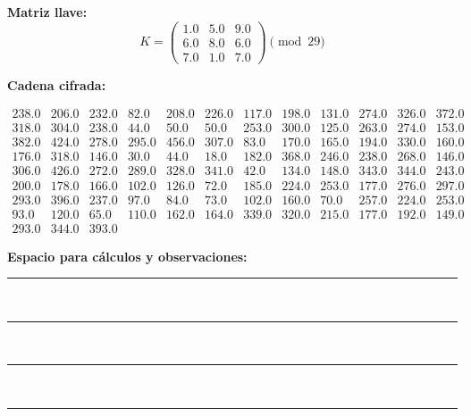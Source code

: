 \documentclass{article}%
\begin{document}
\textbf{Matriz llave:}
\[
K = \begin{pmatrix}
1.0 & 5.0 & 9.0 \\
6.0 & 8.0 & 6.0 \\
7.0 & 1.0 & 7.0
\end{pmatrix} \pmod{29}
\]

\textbf{Cadena cifrada:}
\begin{center}
$\begin{array}{lllllllllllllll}
238.0 & 206.0 & 232.0 & 82.0 & 208.0 & 226.0 & 117.0 & 198.0 & 131.0 & 274.0 & 326.0 & 372.0 \\
318.0 & 304.0 & 238.0 & 44.0 & 50.0 & 50.0 & 253.0 & 300.0 & 125.0 & 263.0 & 274.0 & 153.0 \\
382.0 & 424.0 & 278.0 & 295.0 & 456.0 & 307.0 & 83.0 & 170.0 & 165.0 & 194.0 & 330.0 & 160.0 \\
176.0 & 318.0 & 146.0 & 30.0 & 44.0 & 18.0 & 182.0 & 368.0 & 246.0 & 238.0 & 268.0 & 146.0 \\
306.0 & 426.0 & 272.0 & 289.0 & 328.0 & 341.0 & 42.0 & 134.0 & 148.0 & 343.0 & 344.0 & 243.0 \\
200.0 & 178.0 & 166.0 & 102.0 & 126.0 & 72.0 & 185.0 & 224.0 & 253.0 & 177.0 & 276.0 & 297.0 \\
293.0 & 396.0 & 237.0 & 97.0 & 84.0 & 73.0 & 102.0 & 160.0 & 70.0 & 257.0 & 224.0 & 253.0 \\
93.0 & 120.0 & 65.0 & 110.0 & 162.0 & 164.0 & 339.0 & 320.0 & 215.0 & 177.0 & 192.0 & 149.0 \\
293.0 & 344.0 & 393.0
\end{array}$
\end{center}

\bigskip
\textbf{Espacio para cálculos y observaciones:}\\[6pt]
\rule{\linewidth}{0.4pt}\\[10pt]
\rule{\linewidth}{0.4pt}\\[10pt]
\rule{\linewidth}{0.4pt}\\[10pt]
\rule{\linewidth}{0.4pt}\\[10pt]
%
\end{document}
